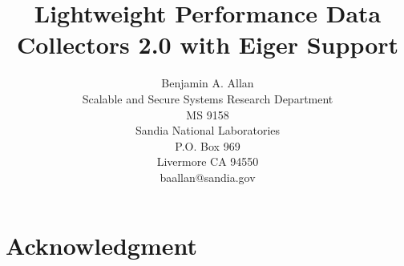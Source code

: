 \documentclass[pdf,relax,report,12pt]{SANDreport}
\title{Lightweight Performance Data Collectors 2.0 with Eiger Support}
\author{Benjamin A. Allan \\
	  Scalable and Secure Systems Research Department \\
	  MS 9158 \\
	  Sandia National Laboratories\\
	  P.O. Box 969\\
	  Livermore CA 94550 \\
	  baallan@sandia.gov \\
	 }
\date{}
\begin{document}
    \maketitle

    \begin{abstract}
	
    \end{abstract}


    \clearpage
    \chapter*{Acknowledgment}
	


    \clearpage		%
    \tableofcontents


%


%
\end{document}
